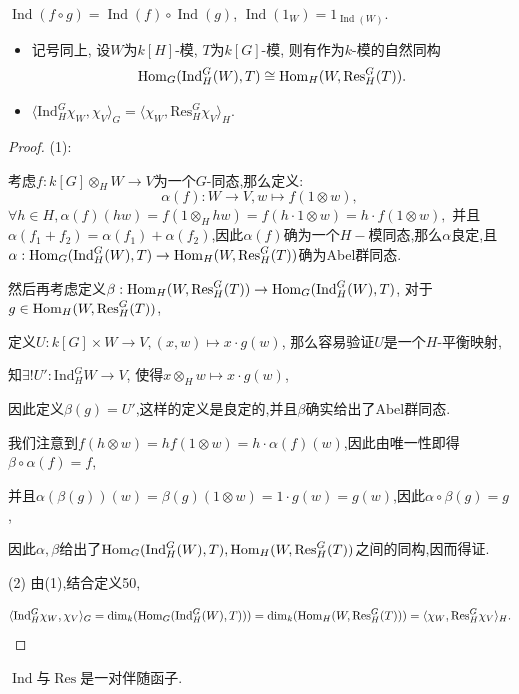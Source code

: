 \begin{proposition}
    $\operatorname{Ind}(f\circ g)=\operatorname{Ind}(f)\circ \operatorname{Ind}(g)$, 
    $\operatorname{Ind}(1_W)=1_{\operatorname{Ind}(W)}$.
\end{proposition}

\begin{proposition}
    \begin{itemize}

    \item[(1)]
    记号同上, 设$W$为$k[H]$-模, $T$为$k[G]$-模, 则有作为$k$-模的自然同构
    $$\operatorname{Hom}_G(\operatorname{Ind}_H^G(W),T)
    \cong \operatorname{Hom}_H(W,\operatorname{Res}_H^G(T)).$$
    \item[(2)]
    $\langle \mathrm{Ind}_H^G \chi_W, \chi_V\rangle_G = \langle \chi_W, \mathrm{Res}_H^G \chi_V\rangle_H.$
    \end{itemize}
\end{proposition}

\begin{proof}
    (1):

    考虑$f:k[G] \otimes_H W \to V$为一个$G$-同态,那么定义:
    $$\alpha(f) : W \to V, w \mapsto f(1 \otimes w),$$
    $\forall h \in H, \alpha(f)(hw) = f(1\otimes_H hw) = f(h \cdot 1 \otimes w) = h\cdot f(1\otimes w),$
    并且$\alpha(f_1+f_2) = \alpha(f_1) + \alpha(f_2)$,因此$\alpha(f)$确为一个$H-$模同态,那么$\alpha$良定,且
    $\alpha:\operatorname{Hom}_G(\operatorname{Ind}_H^G(W),T)
    \to \operatorname{Hom}_H(W,\operatorname{Res}_H^G(T)) $确为Abel群同态.

    然后再考虑定义$\beta : 
    \operatorname{Hom}_H(W,\operatorname{Res}_H^G(T)) \to \operatorname{Hom}_G(\operatorname{Ind}_H^G(W),T)$,
    对于$g\in 
     \operatorname{Hom}_H(W,\operatorname{Res}_H^G(T))$,
    
    定义$U: k[G] \times W \to V, (x, w ) \mapsto x \cdot g(w)$,
    那么容易验证$U$是一个$H$-平衡映射,
    
    知$\exists ! U' : \mathrm{Ind}_H^G W \to V$,
    使得$x\otimes_H w \mapsto x\cdot g(w)$,

    因此定义$\beta(g) = U'$,这样的定义是良定的,并且$\beta$确实给出了Abel群同态.

    我们注意到$f(h \otimes w) = h f(1 \otimes w) = h \cdot \alpha(f)(w)$,因此由唯一性即得$\beta \circ \alpha (f) = f$,

    并且$\alpha(\beta(g)) (w) = \beta(g) (1\otimes w) = 1 \cdot g(w) = g(w)$,因此$\alpha\circ \beta (g) = g$,

    因此$\alpha, \beta$给出了$\operatorname{Hom}_G(\operatorname{Ind}_H^G(W),T)
    ,\operatorname{Hom}_H(W,\operatorname{Res}_H^G(T))$之间的同构,因而得证.

    (2)
    由(1),结合定义50,
    
    $$\langle \mathrm{Ind}_H^G \chi_W, \chi_V\rangle_G = \dim_k(\operatorname{Hom}_G(\operatorname{Ind}_H^G(W),T))) = 
    \dim_k (\operatorname{Hom}_H(W,\operatorname{Res}_H^G(T))) = \langle \chi_W, \mathrm{Res}_H^G \chi_V\rangle_H.$$
    
    

\end{proof}
\begin{proposition}
    $\operatorname{Ind}$与$\operatorname{Res}$是一对伴随函子.
\end{proposition}

